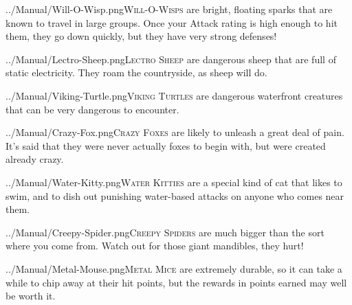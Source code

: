 \documentclass[10pt,twocolumn,openany,article]{memoir}
\begin{document}
\vspace{14pt}

\lettrine[image=true,                lines=5,               findent=3pt,
nindent=3pt]{../Manual/Will-O-Wisp.png}{Will-O-Wisps}     are    bright,
floating sparks  that are  known to  travel in  large groups.  Once your
Attack rating is high enough to hit them, they go down quickly, but they
have very strong defenses!

\vspace{14pt}

\lettrine[image=true,                lines=5,               findent=3pt,
nindent=3pt]{../Manual/Lectro-Sheep.png}{Lectro  Sheep}   are  dangerous
sheep that are full of static electricity. They roam the countryside, as
sheep will do.

\vspace{14pt}

\lettrine[image=true,                lines=5,               findent=3pt,
nindent=3pt]{../Manual/Viking-Turtle.png}{Viking Turtles}  are dangerous
waterfront creatures that can be very dangerous to encounter.

\vspace{14pt}

\lettrine[image=true,                lines=5,               findent=3pt,
nindent=3pt]{../Manual/Crazy-Fox.png}{Crazy Foxes} are likely to unleash
a great deal of  pain. It's said that they were  never actually foxes to
begin with, but were created already crazy.

\vspace{14pt}

\lettrine[image=true,                lines=5,               findent=3pt,
nindent=3pt]{../Manual/Water-Kitty.png}{Water  Kitties}  are  a  special
kind of  cat that likes to  swim, and to dish  out punishing water-based
attacks on anyone who comes near them.

\vspace{14pt}

\lettrine[image=true,                lines=5,               findent=3pt,
nindent=3pt]{../Manual/Creepy-Spider.png}{Creepy   Spiders}   are   much
bigger than  the sort  where you  come from. Watch  out for  those giant
mandibles, they hurt!

\vspace{14pt}

\lettrine[image=true,                lines=5,               findent=3pt,
nindent=3pt]{../Manual/Metal-Mouse.png}{Metal   Mice}    are   extremely
durable, so it  can take a while  to chip away at their  hit points, but
the rewards in points earned may well be worth it.
\end{document}
